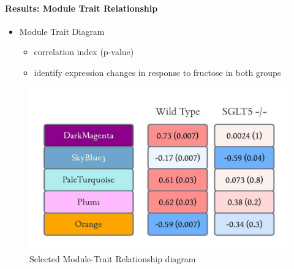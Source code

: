 \documentclass[
11pt,notheorems,hyperref={pdfauthor=whatever}
]{beamer}
\begin{document}
\begin{frame}
    \framesubtitle{Results: Module Trait Relationship}
        \begin{itemize}
            \item Module Trait Diagram
            \begin{itemize}
                \item correlation index (p-value)
                \item identify expression changes in response to fructose in both groups
            \end{itemize}
        \end{itemize}

        \begin{figure}[h]
            \renewcommand{\figurename}{Figure 8}
            \includegraphics [scale=0.8] {AldoFruc_ModuleTraitResult.jpg} 
            \captionsetup{justification=centering}
            \caption{Selected Module-Trait Relationship diagram}
        \end{figure}
\end{frame}
\end{document}
